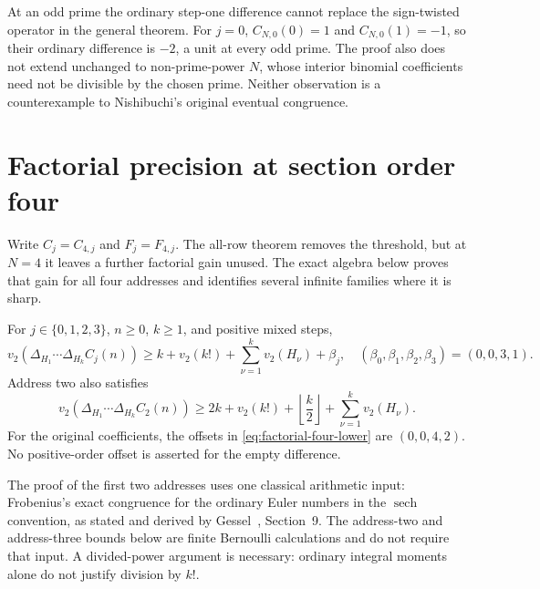 \begin{remark}
At an odd prime the ordinary step-one difference cannot replace the
sign-twisted operator in the general theorem. For $j=0$,
$C_{N,0}(0)=1$ and $C_{N,0}(1)=-1$, so their ordinary difference is
$-2$, a unit at every odd prime. The proof also does not extend
unchanged to non-prime-power $N$, whose interior binomial coefficients
need not be divisible by the chosen prime. Neither observation is a
counterexample to Nishibuchi's original eventual congruence.
\end{remark}

\section{Factorial precision at section order four}
\label{sec:factorial-four-final}

Write $C_j=C_{4,j}$ and $F_j=F_{4,j}$. The all-row theorem removes the
threshold, but at $N=4$ it leaves a further factorial gain unused.
The exact algebra below proves that gain for all four addresses and
identifies several infinite families where it is sharp.

\begin{theorem}
\label{thm:four-factorial-bound}
For $j\in\{0,1,2,3\}$, $n\geq0$, $k\geq1$, and positive mixed steps,
\begin{equation}
 v_2(\Delta_{H_1}\cdots\Delta_{H_k}C_j(n))
 \geq k+v_2(k!)+\sum_{\nu=1}^k v_2(H_\nu)+\beta_j,
 \quad (\beta_0,\beta_1,\beta_2,\beta_3)=(0,0,3,1).
 \label{eq:factorial-four-lower}
\end{equation}
Address two also satisfies
\begin{equation}
 v_2(\Delta_{H_1}\cdots\Delta_{H_k}C_2(n))
 \geq 2k+v_2(k!)+\left\lfloor\frac{k}{2}\right\rfloor
             +\sum_{\nu=1}^k v_2(H_\nu).
 \label{eq:factorial-four-j2-filtration}
\end{equation}
For the original coefficients, the offsets in
\eqref{eq:factorial-four-lower} are $(0,0,4,2)$.
No positive-order offset is asserted for the empty difference.
\end{theorem}

The proof of the first two addresses uses one classical arithmetic
input: Frobenius's exact congruence for the ordinary Euler numbers in
the $\operatorname{sech}$ convention, as stated and derived by
Gessel~\cite{gessel}, Section~9. The address-two and address-three
bounds below are finite Bernoulli calculations and do not require that
input. A divided-power argument is necessary: ordinary integral moments
alone do not justify division by $k!$.

